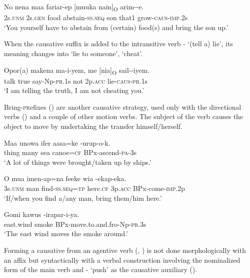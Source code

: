 \ea%
\label{ex:3:x996}
\gll No nena maa fariar-ep [muuka nain]\textsubscript{O} arim--e.\\
2s.\textsc{unm} 2s.\textsc{gen} food abstain-\textsc{ss}.\textsc{seq} son that1 grow-\textsc{caus}-\textsc{imp}.2s\\
\glt`You yourself have to abstain from (certain) food(s) and bring the son up.'
\z

When the causative suffix is added to the intransitive verb - `(tell a) lie', its meaning changes into `lie to someone', `cheat'. 

\ea%
\label{ex:3:x448}
\gll Opor(a) makena ma-i-yem, me [nia]\textsubscript{O} sail--iyem. \\
talk true say-Np-\textsc{pr}.1s not 2p.\textsc{acc} lie-\textsc{caus}-\textsc{pr}.1s\\
\glt`I am telling the truth, I am not cheating you.'
\z

Bring-\textsc{pr}efixes () are another causative strategy, used only with the directional verbs () and a couple of other motion verbs. The subject of the verb causes the object to move by undertaking the transfer himself/herself.

\ea%
\label{ex:3:x999}
\gll Maa unowa ifer aasa=ke -urup-o-k. \\
thing many sea canoe=\textsc{cf} BPx-ascend-\textsc{pa}-3s\\
\glt`A lot of things were brought/taken up by ships.'
\z

\ea%
\label{ex:3:x1001}
\gll O mua imen-ap=na feeke wia -ekap-eka. \\
3s.\textsc{unm} man find-\textsc{ss}.\textsc{seq}=\textsc{tp} here.\textsc{cf} 3p.\textsc{acc} BPx-come-\textsc{imp}.2p\\
\glt`If/when you find a/any man, bring them/him here.'
\z

\ea%
\label{ex:3:x1000}
\gll Gomi kawus -irapar-i-ya. \\
east.wind smoke BPx-move.to.and.fro-Np-\textsc{pr}.3s\\
\glt`The east wind moves the smoke around.'
\z

Forming a causative from an agentive verb (, \citealt[112]{Talmy2007}) is not done morphologically with an affix but syntactically with a verbal construction involving the nominalized form of the main verb and - `push' as the causative auxiliary (). 

